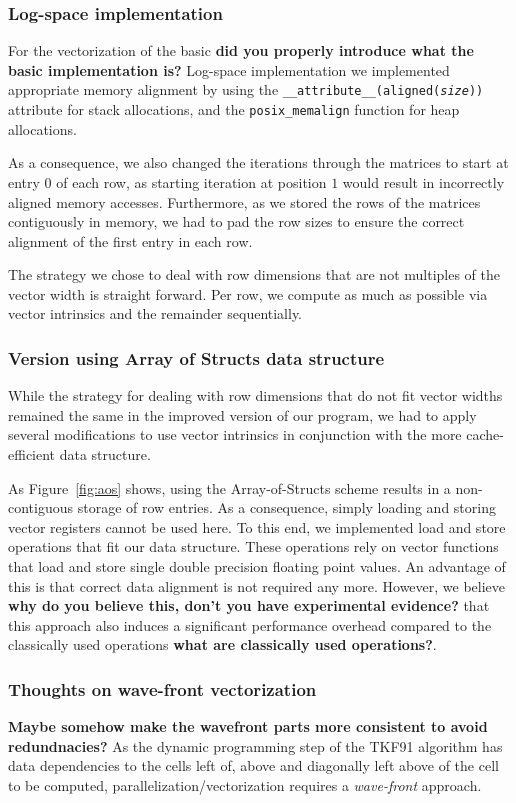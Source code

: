 \documentclass[runningheads,a4paper]{llncs}
\begin{document}
\subsubsection{Log-space implementation}
For the vectorization of the basic {\bf did you properly introduce what the basic implementation is?} 
Log-space implementation we implemented appropriate memory alignment by using the \texttt{\_\_attribute\_\_(aligned(\textit{size}))} attribute for stack allocations, 
and the \texttt{posix\_memalign} function for heap allocations.

As a consequence, we also changed the iterations through the matrices to start at entry $0$ of each row, as starting iteration at position $1$ would result in incorrectly aligned memory accesses. 
Furthermore, as we stored the rows of the matrices contiguously in memory, we had to pad the row sizes 
to ensure the correct alignment of the first entry in each row.

The strategy we chose to deal with row dimensions that are not multiples of the vector width is straight forward. 
Per row, we compute as much as possible via vector intrinsics and the remainder sequentially. 

\subsubsection{Version using Array of Structs data structure}
While the strategy for dealing with row dimensions that do not fit vector widths remained the same in the improved version of our program, 
we had to apply several modifications to use vector intrinsics in conjunction with the more cache-efficient data structure.

As Figure~\ref{fig:aos} shows, using the Array-of-Structs scheme results in a non-contiguous storage of row entries. 
As a consequence, simply loading and storing vector registers cannot be used here. 
To this end, we implemented load and store operations that fit our data structure. These operations rely on vector functions that load and store single double precision floating point values. 
An advantage of this is that correct data alignment is not required any more. 
However, we believe {\bf why do you believe this, don't you have experimental evidence?} that this approach also induces a significant performance overhead 
compared to the classically used operations {\bf what are classically used operations?}.

\subsubsection{Thoughts on wave-front vectorization}
{\bf Maybe somehow make the wavefront parts more consistent to avoid redundnacies?} 
As the dynamic programming step of the TKF91 algorithm has data dependencies to the cells left of, above and diagonally left above of the cell to be computed, 
parallelization/vectorization requires a \textit{wave-front} approach.
\end{document}

